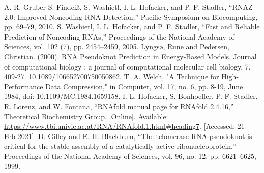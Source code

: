 \documentclass[sigconf]{acmart}
\begin{document}
\begin{thebibliography}{10}
	 A. R. Gruber S. Findeiß, S. Washietl, I. L. Hofacker, and P. F. Stadler, “RNAZ 2.0: Improved Noncoding RNA Detection,” Pacific Symposium on Biocomputing, pp. 69–79, 2010. 
	 S. Washietl, I. L. Hofacker, and P. F. Stadler, “Fast and Reliable Prediction of Noncoding RNAs,” Proceedings of the National Academy of Sciences, vol. 102 (7), pp. 2454–2459, 2005.  
	 Lyngsø, Rune and Pedersen, Christian. (2000). RNA Pseudoknot Prediction in Energy-Based Models. Journal of computational biology : a journal of computational molecular cell biology. 7. 409-27. 10.1089/106652700750050862. 
	 T. A. Welch, "A Technique for High-Performance Data Compression," in Computer, vol. 17, no. 6, pp. 8-19, June 1984, doi: 10.1109/MC.1984.1659158.
	 I. L. Hofacker, S. Bonhoeffer, P. F. Stadler, R. Lorenz, and W. Fontana, “RNAfold manual page for RNAfold 2.4.16,” Theoretical Biochemistry Group. [Online]. Available: \url{https://www.tbi.univie.ac.at/RNA/RNAfold.1.html#heading7}. [Accessed: 21-Feb-2021]. 
	 D. Gilley and E. H. Blackburn, “The telomerase RNA pseudoknot is critical for the stable assembly of a catalytically active ribonucleoprotein,” Proceedings of the National Academy of Sciences, vol. 96, no. 12, pp. 6621–6625, 1999. 
\end{thebibliography}	
\end{document}
